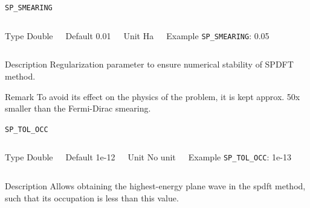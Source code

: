 \begin{frame}[allowframebreaks]{\texttt{SP\_SMEARING}} \label{SP_SMEARING}
\vspace*{-12pt}
\begin{columns}
\begin{block}{Type}
Double
\end{block}

\begin{block}{Default}
0.01
\end{block}

\begin{block}{Unit}
Ha
\end{block}

\begin{block}{Example}
\texttt{SP\_SMEARING}: 0.05
\end{block}
\end{columns}

\begin{block}{Description}
Regularization parameter to ensure numerical stability of SPDFT method.
\end{block}

\begin{block}{Remark}
To avoid its effect on the physics of the problem, it is kept approx. 50x smaller than the Fermi-Dirac smearing.
\end{block}

\end{frame}

\begin{frame}[allowframebreaks]{\texttt{{SP\_TOL\_OCC}}} \label{SP_TOL_OCC}
\vspace*{-12pt}
\begin{columns}
\begin{block}{Type}
Double
\end{block}

\begin{block}{Default}
1e-12
\end{block}

\begin{block}{Unit}
No unit
\end{block}

\begin{block}{Example}
\texttt{SP\_TOL\_OCC}: 1e-13
\end{block}
\end{columns}

\begin{block}{Description}
Allows obtaining the highest-energy plane wave in the spdft method, such that its occupation is less than this value.
\end{block}

\end{frame}

